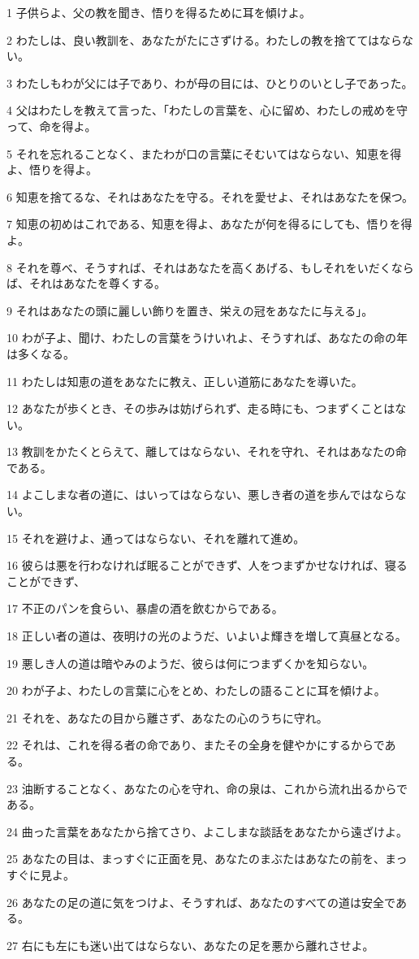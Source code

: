 \par 1 子供らよ、父の教を聞き、悟りを得るために耳を傾けよ。
\par 2 わたしは、良い教訓を、あなたがたにさずける。わたしの教を捨ててはならない。
\par 3 わたしもわが父には子であり、わが母の目には、ひとりのいとし子であった。
\par 4 父はわたしを教えて言った、「わたしの言葉を、心に留め、わたしの戒めを守って、命を得よ。
\par 5 それを忘れることなく、またわが口の言葉にそむいてはならない、知恵を得よ、悟りを得よ。
\par 6 知恵を捨てるな、それはあなたを守る。それを愛せよ、それはあなたを保つ。
\par 7 知恵の初めはこれである、知恵を得よ、あなたが何を得るにしても、悟りを得よ。
\par 8 それを尊べ、そうすれば、それはあなたを高くあげる、もしそれをいだくならば、それはあなたを尊くする。
\par 9 それはあなたの頭に麗しい飾りを置き、栄えの冠をあなたに与える」。
\par 10 わが子よ、聞け、わたしの言葉をうけいれよ、そうすれば、あなたの命の年は多くなる。
\par 11 わたしは知恵の道をあなたに教え、正しい道筋にあなたを導いた。
\par 12 あなたが歩くとき、その歩みは妨げられず、走る時にも、つまずくことはない。
\par 13 教訓をかたくとらえて、離してはならない、それを守れ、それはあなたの命である。
\par 14 よこしまな者の道に、はいってはならない、悪しき者の道を歩んではならない。
\par 15 それを避けよ、通ってはならない、それを離れて進め。
\par 16 彼らは悪を行わなければ眠ることができず、人をつまずかせなければ、寝ることができず、
\par 17 不正のパンを食らい、暴虐の酒を飲むからである。
\par 18 正しい者の道は、夜明けの光のようだ、いよいよ輝きを増して真昼となる。
\par 19 悪しき人の道は暗やみのようだ、彼らは何につまずくかを知らない。
\par 20 わが子よ、わたしの言葉に心をとめ、わたしの語ることに耳を傾けよ。
\par 21 それを、あなたの目から離さず、あなたの心のうちに守れ。
\par 22 それは、これを得る者の命であり、またその全身を健やかにするからである。
\par 23 油断することなく、あなたの心を守れ、命の泉は、これから流れ出るからである。
\par 24 曲った言葉をあなたから捨てさり、よこしまな談話をあなたから遠ざけよ。
\par 25 あなたの目は、まっすぐに正面を見、あなたのまぶたはあなたの前を、まっすぐに見よ。
\par 26 あなたの足の道に気をつけよ、そうすれば、あなたのすべての道は安全である。
\par 27 右にも左にも迷い出てはならない、あなたの足を悪から離れさせよ。

